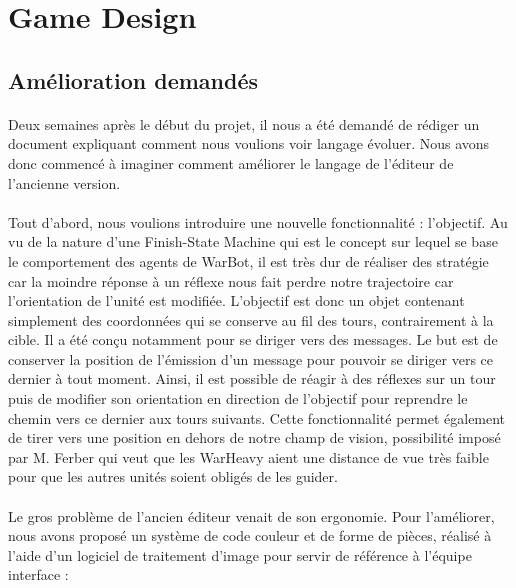 \documentclass{report}
\begin{document}
\section{Game Design}

\subsection{Amélioration demandés}
\paragraph{}
  Deux semaines après le début du projet, il nous a été demandé de rédiger un document expliquant comment nous voulions voir langage évoluer. Nous avons donc commencé à imaginer comment améliorer le langage de l’éditeur de l’ancienne version.
\paragraph{}
  Tout d’abord, nous voulions introduire une nouvelle fonctionnalité : l’objectif. Au vu de la nature d’une Finish-State Machine qui est le concept sur lequel se base le comportement des agents de WarBot, il est très dur de réaliser des stratégie car la moindre réponse à un réflexe nous fait perdre notre trajectoire car l'orientation de l'unité est modifiée. \newline
L’objectif est donc un objet contenant simplement des coordonnées qui se conserve au fil des tours, contrairement à la cible. Il a été conçu notamment pour se diriger vers des messages. Le but est de conserver la position de l’émission d’un message pour pouvoir se diriger vers ce dernier à tout moment. \newline
Ainsi, il est possible de réagir à des réflexes sur un tour puis de modifier son orientation en direction de l’objectif pour reprendre le chemin vers ce dernier aux tours suivants. Cette fonctionnalité permet également de tirer vers une position en dehors de notre champ de vision, possibilité imposé par M. Ferber qui veut que les WarHeavy aient une distance de vue très faible pour que les autres unités soient obligés de les guider.
\newpage
\paragraph{}
  Le gros problème de l’ancien éditeur venait de son ergonomie. Pour l’améliorer, nous avons proposé un système de code couleur et de forme de pièces, réalisé à l’aide d'un logiciel de traitement d'image pour servir de référence à l’équipe interface :
\end{document}
